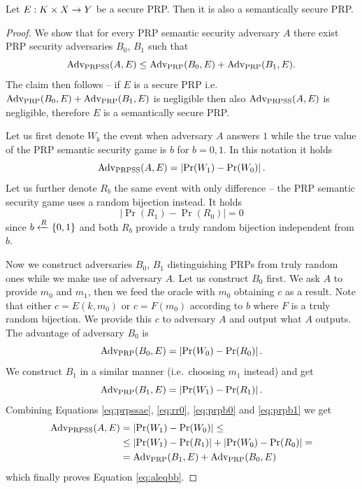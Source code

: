 \begin{thm}
\label{thm:semsecprp}
	Let $E: K\times X\rightarrow Y$ be a secure PRP. Then it is also a semantically secure PRP.
\end{thm}
\begin{proof}
	We show that for every PRP semantic security adversary $A$ there exist PRP security adversaries $B_0$, $B_1$ such that
	\begin{equation}\label{eq:aleqbb}
		\operatorname*{Adv_{PRPSS}}(A,E) \leq \operatorname*{Adv_{PRP}}(B_0,E) + \operatorname*{Adv_{PRP}}(B_1,E) .
	\end{equation}
	The claim then follows -- if $E$ is a secure PRP i.e. $\operatorname*{Adv_{PRP}}(B_0,E) + \operatorname*{Adv_{PRP}}(B_1,E)$ is negligible then also $\operatorname*{Adv_{PRPSS}}(A,E)$ is negligible, therefore $E$ is a semantically secure PRP.
	
	Let us first denote $W_b$ the event when adversary $A$ answers $1$ while the true value of the PRP semantic security game is $b$ for $b=0,1$. In this notation it holds
	\begin{equation}\label{eq:prpssae}
		\operatorname*{Adv_{PRPSS}}(A,E) = \left| \Pr(W_1) - \Pr(W_0) \right| .
	\end{equation}
	Let us further denote $R_b$ the same event with only difference -- the PRP semantic security game uses a random bijection instead. It holds
	\begin{equation}\label{eq:rr0}
		\left| \Pr(R_1) - \Pr(R_0) \right| = 0
	\end{equation}
	since $b\xleftarrow{R}\{0,1\}$ and both $R_b$ provide a truly random bijection independent from $b$.
	
	Now we construct adversaries $B_0$, $B_1$ distinguishing PRPs from truly random ones while we make use of adversary $A$. Let us construct $B_0$ first. We ask $A$ to provide $m_0$ and $m_1$, then we feed the oracle with $m_0$ obtaining $c$ as a result. Note that either $c=E(k,m_0)$ or $c=F(m_0)$ according to $b$ where $F$ is a truly random bijection. We provide this $c$ to adversary $A$ and output what $A$ outputs. The advantage of adversary $B_0$ is
	\begin{equation}\label{eq:prpb0}
		\operatorname*{Adv_{PRP}}(B_0,E) = \left| \Pr(W_0) - \Pr(R_0) \right| .
	\end{equation}
	We construct $B_1$ in a similar manner (i.e.\ choosing $m_1$ instead) and get
	\begin{equation}\label{eq:prpb1}
		\operatorname*{Adv_{PRP}}(B_1,E) = \left| \Pr(W_1) - \Pr(R_1) \right| .
	\end{equation}
	Combining Equations \ref{eq:prpssae}, \ref{eq:rr0}, \ref{eq:prpb0} and \ref{eq:prpb1} we get
	\begin{align*}
		\operatorname*{Adv_{PRPSS}}(A,E) &= \left| \Pr(W_1) - \Pr(W_0) \right| \leq \\
		&\leq \left| \Pr(W_1) - \Pr(R_1) \right| + \left| \Pr(W_0) - \Pr(R_0) \right| = \\
		&= \operatorname*{Adv_{PRP}}(B_1,E) + \operatorname*{Adv_{PRP}}(B_0,E)
	\end{align*}
	which finally proves Equation \ref{eq:aleqbb}.
\end{proof}

